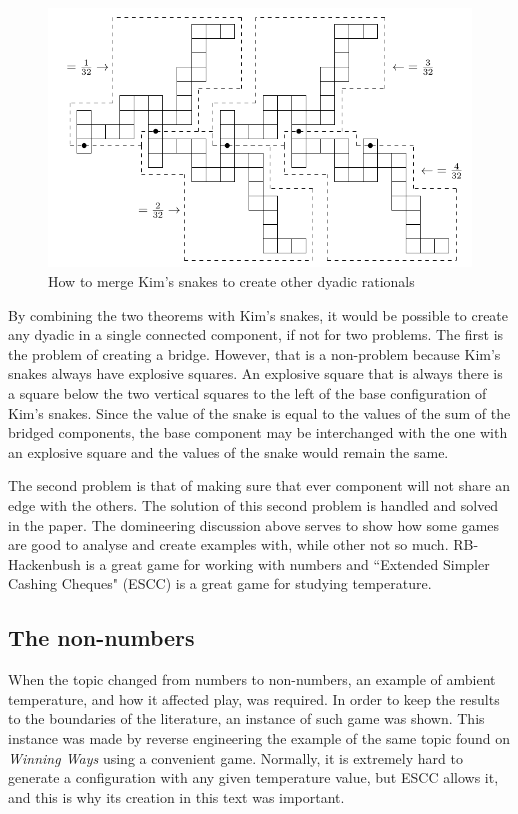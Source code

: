 \begin{figure}[H]
\begin{center}
\includegraphics[scale=0.5]{../images/dyadic_domineering.png}
\caption{How to merge Kim's snakes to create other dyadic rationals}
\end{center}
\end{figure}

By combining the two theorems with Kim's snakes, it would be possible to create any dyadic in a single connected component, if not for two problems. The first is the problem of creating a bridge. However, that is a non-problem because Kim's snakes always have explosive squares. An explosive square that is always there is a square below the two vertical squares to the left of the base configuration of Kim's snakes. Since the value of the snake is equal to the values of the sum of the bridged components, the base component may be interchanged with the one with an explosive square and the values of the snake would remain the same.

The second problem is that of making sure that ever component will not share an edge with the others. The solution of this second problem is handled and solved in the paper. The domineering discussion above serves to show how some games are good to analyse and create examples with, while other not so much. RB-Hackenbush is a great game for working with numbers and ``Extended Simpler Cashing Cheques" (ESCC) is a great game for studying temperature. 

\subsection*{The non-numbers}

When the topic changed from numbers to non-numbers, an example of ambient temperature, and how it affected play, was required. In order to keep the results to the boundaries of the literature, an instance of such game was shown. This instance was made by reverse engineering the example of the same topic found on \textit{Winning Ways} \cite{WW} using a convenient game. Normally, it is extremely hard to generate a configuration with any given temperature value, but ESCC allows it, and this is why its creation in this text was important.

